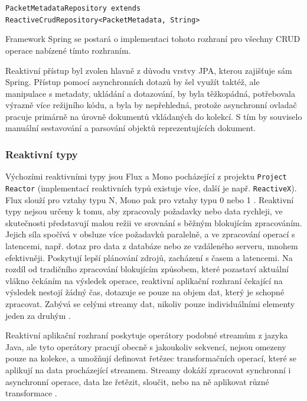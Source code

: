 \vspace{0.5cm}
\texttt{PacketMetadataRepository extends} \\
\indent \indent \indent \texttt{ReactiveCrudRepository<PacketMetadata, String>}

\vspace{0.5cm}
\noindent Framework Spring se postará o implementaci tohoto rozhraní pro všechny CRUD operace nabízené tímto rozhraním.

Reaktivní přístup byl zvolen hlavně z důvodu vrstvy JPA, kterou zajišťuje sám Spring. Přístup pomocí asynchronních dotazů by šel využít taktéž, ale manipulace s metadaty, ukládání a dotazování, by byla těžkopádná, potřebovala výrazně více režijního kódu, a byla by nepřehledná, protože asynchronní ovladač pracuje primárně na úrovně dokumentů vkládaných do kolekcí. S tím by souviselo manuální sestavování a parsování objektů reprezentujících dokument.

\subsubsection{Reaktivní typy}
Výchozími reaktivními typy jsou Flux a Mono pocházející z projektu \texttt{Project Reactor} (implementací reaktivních typů existuje více, další je např. \texttt{ReactiveX}). Flux slouží pro vztahy typu N, Mono pak pro vztahy typu 0 nebo 1 \cite{projectReactor}.
Reaktivní typy nejsou určeny k tomu, aby zpracovaly požadavky nebo data rychleji, ve skutečnosti představují malou režii ve srovnání s běžným blokujícím zpracováním. Jejich síla spočívá v obsluze více požadavků paralelně, a ve zpracování operací s latencemi, např. dotaz pro data z databáze nebo ze vzdáleného serveru, mnohem efektivněji. Poskytují lepší plánování zdrojů, zacházení s časem a latencemi. Na rozdíl od tradičního zpracování blokujícím způsobem, které pozastaví aktuální vlákno čekáním na výsledek operace, reaktivní aplikační rozhraní čekající na výsledek nestojí žádný čas, dotazuje se pouze na objem dat, který je schopné zpracovat. Zabývá se celými streamy dat, nikoliv pouze individuálními elementy jeden za druhým \cite{springReactiveTypes}.

Reaktivní aplikační rozhraní poskytuje operátory podobné streamům z jazyka Java, ale tyto operátory pracují obecně s jakoukoliv sekvencí, nejsou omezeny pouze na kolekce, a umožňují definovat řetězec transformačních operací, které se aplikují na data procházející streamem. Streamy dokáží zpracovat synchronní i asynchronní operace, data lze řetězit, sloučit, nebo na ně aplikovat různé transformace \cite{springReactiveTypes}.

